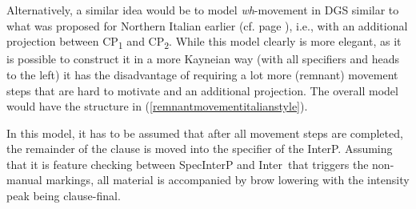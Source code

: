 Alternatively, a similar idea would be to model \textit{wh}-movement in DGS similar to what was proposed for Northern Italian earlier (cf. page \pageref{italianwhdoublinga}), i.e., with an additional projection between CP\textsubscript{1} and CP\textsubscript{2}. While this model clearly is more elegant, as it is possible to construct it in a more Kayneian way (with all specifiers and heads to the left) it has the disadvantage of requiring a lot more (remnant) movement steps that are hard to motivate and an additional projection. The overall model would have the structure in (\ref{remnantmovementitalianstyle}).%

In this model, it has to be assumed that after all movement steps are completed, the remainder of the clause is moved into the specifier of the InterP. Assuming that it is feature checking between SpecInterP and Inter\textdegree\ that triggers the non-manual markings, all material is accompanied by brow lowering with the intensity peak being clause-final. 




